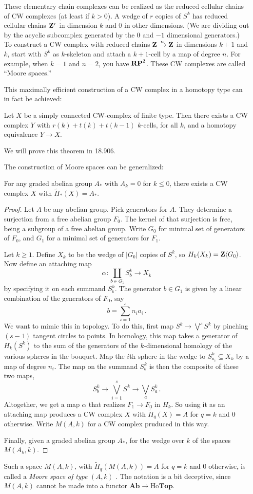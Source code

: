 These elementary chain complexes can be realized as the reduced cellular chains of CW complexes (at least if $k>0$). A wedge of $r$ copies of $S^k$ has reduced cellular chains $\mathbf Z^r$ in dimension $k$ and 0 in other dimensions.
(We are dividing out by the acyclic subcomplex generated by the $0$ and 
$-1$ dimensional generators.)
To construct a CW complex with reduced chains $\mathbf Z\xrightarrow{n}\mathbf Z$ in dimensions $k+1$ and $k$, start with $S^k$ as $k$-skeleton and attach a $k+1$-cell
by a map of degree $n$.
For example, when $k=1$ and $n=2$, you have $\mathbf{RP}^2$. These CW complexes are
called ``Moore spaces.'' 

This maximally efficient construction of a CW complex in a homotopy type
can in fact be achieved:

\begin{theorem}
Let $X$ be a simply connected CW-complex of finite type. Then there exists a CW complex $Y$ with $r(k)+t(k)+t(k-1)$ $k$-cells, for all $k$, and a homotopy equivalence $Y\to X$.
\end{theorem}

We will prove this theorem in 18.906.

The construction of Moore spaces can be generalized:
\begin{prop} For any graded abelian group $A_*$ with $A_k=0$ for $k\leq0$, 
there exists a CW complex $X$ with $\widetilde H_*(X)=A_*$.
\end{prop}
\begin{proof}
Let $A$ be any abelian group. Pick generators for $A$. 
They determine a surjection
from a free abelian group $F_0$. The kernel of that surjection is free,
being a subgroup of a free abelian group. Write $G_0$ for minimal set of
generators of $F_0$, and $G_1$ for a minimal set of generators for $F_1$.

Let $k\geq1$. Define $X_k$ to be the wedge of $|G_0|$ copies of $S^k$,
so $H_k(X_k)=\mathbf Z\langle G_0\rangle$. Now define an attaching map 
\[
\alpha:\coprod_{b\in G_1} S^k_b\to X_k
\]
by specifying it on each summand $S^k_b$. The generator 
$b\in G_1$ is given by a linear combination of the generators
of $F_0$, say 
\[
b=\sum_{i=1}^s n_ia_i\,.
\]
We want to mimic this in topology. To do this, first
map $S^k\to\bigvee^s S^k$ by pinching $(s-1)$ tangent circles to points. 
In homology, this map takes a generator of $H_k(S^k)$ to the sum of the
generators of the $k$-dimensional homology of the various spheres in the
bouquet.
Map the $i$th sphere in the wedge to $S^k_{a_i}\subseteq X_k$ by a map of
degree $n_i$. The map on the summand $S^k_b$ is then the composite of these 
two maps,
\[
S^k_b\to\bigvee_{i=1}^s S^k\to\bigvee_a S^k_a\,.
\]
Altogether, we get a map $\alpha$ that realizes $F_1\to F_0$ in $H_k$.
So using it as an attaching map produces a CW complex $X$ with 
$\widetilde H_q(X)=A$ for $q=k$ and 0 otherwise. Write $M(A,k)$ for 
a CW complex pruduced in this way.

Finally, given a graded abelian group $A_*$, for the wedge over $k$ of the
spaces $M(A_k,k)$. 
\end{proof}

Such a space $M(A,k)$, with $\widetilde H_q(M(A,k))=A$ for $q=k$ and 0 
otherwise, is called a {\em Moore space of type} $(A,k)$ \cite{moore}. 
The notation is a bit deceptive, since $M(A,k)$ cannot be made into a functor
$\mathbf{Ab}\to\mathrm{Ho}\mathbf{Top}$.


